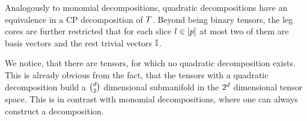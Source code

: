 
Analogously to monomial decompositions, quadratic decompositions have an equivalence in a CP decomposition of $T$.
Beyond being binary tensors, the leg cores are further restricted that for each slice $l\in[p]$ at most two of them are basis vectors and the rest trivial vectors $\mathbb{I}$.

We notice, that there are tensors, for which no quadratic decomposition exists.
This is already obvious from the fact, that the tensors with a quadratic decomposition build a $\binom{d}{2}$ dimensional submanifold in the $2^d$ dimensional tensor space.
This is in contrast with monomial decompositions, where one can always construct a decomposition.





